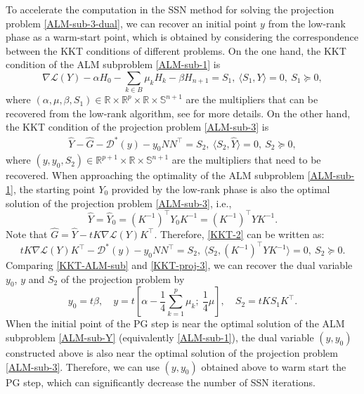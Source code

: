 \documentclass[11pt]{article}
\theoremstyle{plain}
\def\L{\mathcal{L}}
\def\R{\mathbb{R}}
\def\S{\mathbb{S}}
\begin{document}
To accelerate the computation in the SSN method for solving the projection problem \eqref{ALM-sub-3-dual}, we can recover an initial point $y$ from the low-rank phase as a warm-start point, which is obtained by considering the correspondence between the KKT conditions of different problems. On the one hand, the KKT condition of the ALM subproblem \eqref{ALM-sub-1} is
\begin{equation}\label{KKT-ALM-sub}\tag{KKT-1}
\nabla \L(Y) - \alpha H_0 - \sum_{k\in B}\mu_k H_k - \beta H_{n+1}=S_1,\ \langle S_1,Y\rangle =0, \ S_1\succeq 0,
\end{equation}
where $(\alpha,\mu,\beta,S_1)\in\R\times\R^{p}\times\R\times\S^{n+1}$ are the multipliers that can be recovered from the low-rank algorithm, see \cite[Subsection 4.1]{RiNNAL} for more details. On the other hand, the KKT condition of the projection problem \eqref{ALM-sub-3} is
\begin{align}\label{KKT-2}\tag{KKT-2}
\widehat{Y}-\widehat{G}-\mathcal{D}^*(y)-y_0 NN^\top = S_2,\ \langle S_2,\widehat{Y}\rangle =0,\ S_2\succeq 0,
\end{align}
where $(y,y_0,S_2)\in\R^{p+1}\times\R\times\S^{n+1}$ are the multipliers that need to be recovered.
When approaching the optimality of the ALM subproblem \eqref{ALM-sub-1}, the starting point $Y_0$ provided by the low-rank phase is also the optimal solution of the projection problem \eqref{ALM-sub-3}, i.e.,
\[
\widehat{Y}=\widehat{Y}_0=(K^{-1})^{\top}Y_0K^{-1}=(K^{-1})^{\top}YK^{-1}.
\]
Note that $\widehat{G}=\widehat{Y}-tK\nabla \L(Y)K^\top$. Therefore, \eqref{KKT-2} can be written as:
\begin{equation}\label{KKT-proj-3}\tag{KKT-3}
tK\nabla \L(Y)K^\top-\mathcal{D}^*(y)-y_0 NN^\top = S_2,\ \langle S_2,(K^{-1})^{\top}YK^{-1}\rangle =0,\ S_2\succeq 0.
\end{equation}
Comparing \eqref{KKT-ALM-sub} and \eqref{KKT-proj-3}, we can recover the dual variable $y_0$, $y$ and $S_2$ of the projection problem by 
\[
y_0=t\beta,\quad y=t\left[\alpha-\frac{1}{4}\sum_{k=1}^{p} \mu_k;\ \frac{1}{4}\mu\right],\quad S_2=tKS_1K^{\top}.
\]
When the initial point of the PG step is near the optimal solution of the ALM subproblem \eqref{ALM-sub-Y} (equivalently \eqref{ALM-sub-1}), the dual variable $(y,y_0)$ constructed above is also near the optimal solution of the projection problem \eqref{ALM-sub-3}. Therefore, we can use $(y,y_0)$ obtained above to warm start the PG step, which can significantly decrease the number of SSN iterations. 
\end{document}
